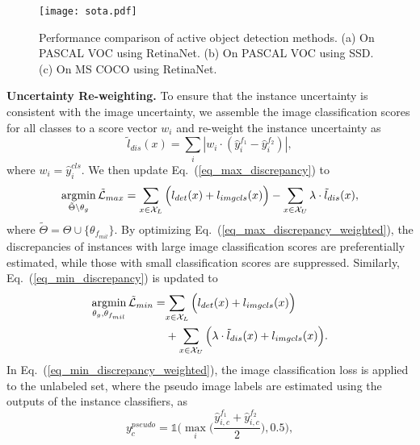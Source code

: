 \documentclass[final]{cvpr}
\DeclareMathOperator*{\argmin}{argmin}
\begin{document}
\begin{figure*}[ht!]
    \centering
\texttt{[image: sota.pdf]}
    \caption{Performance comparison of active object detection methods. (a) On PASCAL VOC using RetinaNet. (b) On PASCAL VOC using SSD. (c) On MS COCO using RetinaNet.}
    \label{fig:SOTA}
\end{figure*}

\textbf{Uncertainty Re-weighting.} To ensure that the instance uncertainty is consistent with the image uncertainty, we assemble the image classification scores for all classes to a score vector $w_i$ and re-weight the instance uncertainty as
\begin{equation}
    \label{eq_discrepancy_with_mil_weight}
\tilde{l}_{dis}(x) = \sum_{i}|{w_i}\cdot({\hat y_{i}^{f_1}} - {\hat y_{i}^{f_2}})|,
\end{equation}
where $w_i = \hat{y}_{i}^{cls}$. We then update Eq.~(\ref{eq_max_discrepancy}) to
\begin{equation}
    \label{eq_max_discrepancy_weighted}
     \argmin_{\tilde{\Theta} \setminus \theta_{g}}\tilde{{\cal L}}_{max} = \sum_{x\in {\cal X}_L}\Big(l_{det}(x)+l_{imgcls}(x)\Big) - \sum_{x\in {\cal X}_U} \lambda \cdot \tilde{l}_{dis}(x),
\end{equation}
where $\tilde{\Theta}=\Theta \cup \{\theta_{f_{mil}}\}$.
By optimizing Eq.~(\ref{eq_max_discrepancy_weighted}), the discrepancies of instances with large image classification scores are preferentially estimated, while those with small classification scores are suppressed. 
Similarly, Eq.~(\ref{eq_min_discrepancy}) is updated to
\begin{equation}
    \label{eq_min_discrepancy_weighted}
    \begin{split}
     \argmin_{\theta_g, \theta_{f_{mil}}}\tilde{{\cal L}}_{min} = & {\sum_{x\in {\cal X}_L}\Big(l_{det}(x)+l_{imgcls}(x)\Big)} \\
     & + \sum_{x\in {\cal X}_U} \Big( \lambda \cdot \tilde{l}_{dis}(x) + l_{imgcls}(x) \Big).
     \end{split}
\end{equation}
In Eq.~(\ref{eq_min_discrepancy_weighted}), the image classification loss is applied to the unlabeled set, where the pseudo image labels are estimated using the outputs of the instance classifiers, as
\begin{equation}
    \label{eq_pseudo_image_label}
     y_{c}^{pseudo} = \mathbb{1}\bigg(\max_{i}\Big(\frac{\hat{y}_{i,c}^{f_1} + \hat{y}_{i,c}^{f_2}}{2}\Big), 0.5\bigg),
\end{equation}
\end{document}

